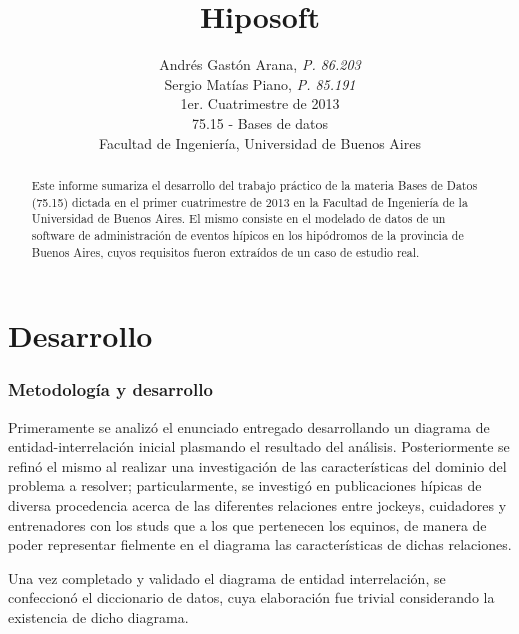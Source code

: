 \documentclass[a4paper,11pt]{article}
\title{\textbf{Hiposoft}}
\author{
  Andrés Gastón Arana, \textit{P. 86.203}                          \\
  Sergio Matías Piano, \textit{P. 85.191}                          \\
  \normalsize{1er. Cuatrimestre de 2013}                           \\
  \normalsize{75.15 - Bases de datos}                              \\
  \normalsize{Facultad de Ingeniería, Universidad de Buenos Aires}
}
\date{}
\begin{document}
\thispagestyle{empty}
\maketitle

\begin{abstract}

  Este informe sumariza el desarrollo del trabajo práctico de la materia Bases
  de Datos (75.15) dictada en el primer cuatrimestre de 2013 en la Facultad de
  Ingeniería de la Universidad de Buenos Aires. El mismo consiste en el
  modelado de datos de un software de administración de eventos hípicos en los
  hipódromos de la provincia de Buenos Aires, cuyos requisitos fueron extraídos
  de un caso de estudio real.

\end{abstract}

\clearpage

\tableofcontents
\clearpage


\part{Desarrollo}

\section{Metodología y desarrollo}

Primeramente se analizó el enunciado entregado desarrollando un diagrama de
entidad-interrelación inicial plasmando el resultado del análisis.
Posteriormente se refinó el mismo al realizar una investigación de las
características del dominio del problema a resolver; particularmente, se
investigó en publicaciones hípicas de diversa procedencia acerca de las
diferentes relaciones entre jockeys, cuidadores y entrenadores con los studs
que a los que pertenecen los equinos, de manera de poder representar fielmente
en el diagrama las características de dichas relaciones.

Una vez completado y validado el diagrama de entidad interrelación, se
confeccionó el diccionario de datos, cuya elaboración fue trivial considerando
la existencia de dicho diagrama.
\end{document}
